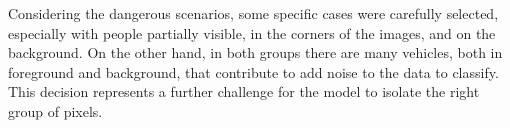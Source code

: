 Considering the dangerous scenarios, some specific cases were carefully selected,
especially with people partially visible, in the corners of the images, and 
on the background. On the other hand, in both groups there are many vehicles, both 
in foreground and background, that contribute to add noise to the data to 
classify.
This decision represents a further challenge for the model to 
isolate the right group of pixels.
\newlength{\subfigurewidth}
\setlength{\subfigurewidth}{4cm}
\newlength{\subfigurehspacing}
\newlength{\subfigurevspacing}
\setlength{\subfigurevspacing}{0.2cm}
\setlength{\subfigurehspacing}{0.05cm}
\begin{figure}
    \centering
    \hspace{\subfigurehspacing}

\end{figure}

